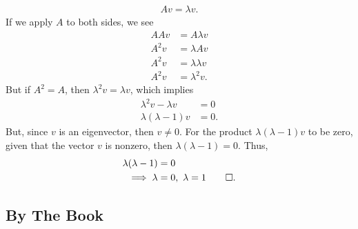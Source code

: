\documentclass{report}
\begin{document}
\begin{itemize}
\begin{align*}
                Av = \lambda v
            .\end{align*}
            If we apply $A$ to both sides, we see
            \begin{align*}
                AAv &= A\lambda v \\
                A^{2}v &= \lambda Av \\
                A^{2}v &= \lambda \lambda v \\
                A^{2}v &= \lambda^{2} v
            .\end{align*}
            But if $A^{2} = A$, then $\lambda^{2} v = \lambda v$, which implies
            \begin{align*}
                \lambda^{2}v - \lambda v &= 0 \\
                \lambda(\lambda - 1)v &= 0
            .\end{align*}
            \bigbreak \noindent 
            But, since $v$ is an eigenvector, then $v\ne 0 $. For the product $\lambda(\lambda-1)v$ to be zero, given that the vector $v$ is nonzero, then $\lambda(\lambda-1)  = 0$. Thus,
            \begin{align*}
                \lambda(\lambda-1) &= 0 \\
                \implies \lambda &=0,\ \lambda = 1 \qed
            .\end{align*}
            
            



    \end{itemize}

    \pagebreak 
    \subsection{By The Book}
    \begin{itemize}
        
    \end{itemize}

    \pagebreak 
\end{document}
